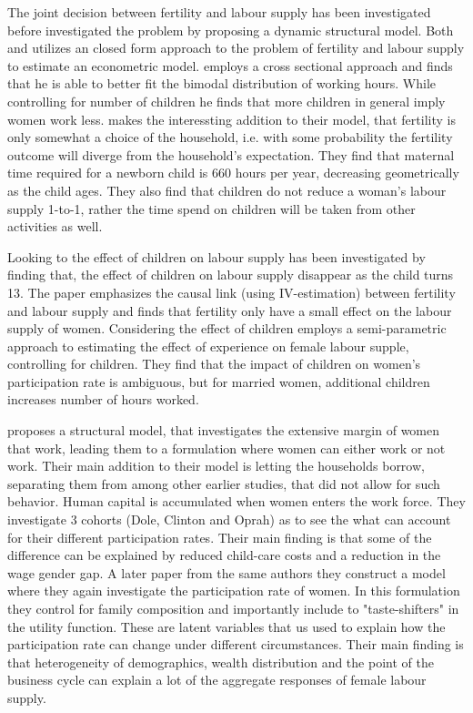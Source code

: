 The joint decision between fertility and labour supply has been investigated before \textcite{francesconi_joint_2002} investigated the problem by proposing a dynamic structural model. Both \textcite{moffitt_estimation_1984} and \textcite{hotz_empirical_1988} utilizes an closed form approach to the problem of fertility and labour supply to estimate an econometric model. \textcite{moffitt_estimation_1984} employs a cross sectional approach and finds that he is able to better fit the bimodal distribution of working hours. While controlling for number of children he finds that more children in general imply women work less. \textcite{hotz_empirical_1988} makes the interessting addition to their model, that fertility is only somewhat a choice of the household, i.e. with some probability the fertility outcome will diverge from the household's expectation. They find that maternal time required for a newborn child is 660 hours per year, decreasing geometrically as the child ages. They also find that children do not reduce a woman's labour supply 1-to-1, rather the time spend on children will be taken from other activities as well.

Looking to the effect of children on labour supply has been investigated by \textcite{angrist_children_1996} finding that, the effect of children on labour supply disappear as the child turns 13. The paper emphasizes the causal link (using IV-estimation) between fertility and labour supply and finds that fertility only have a small effect on the labour supply of women. Considering the effect of children  \textcite{altug_effect_1998} employs a semi-parametric approach to estimating the effect of experience on female labour supple, controlling for children. They find that the impact of children on women's participation rate is ambiguous, but for married women, additional children increases number of hours worked.

\textcite{attanasio_explaining_2008} proposes a structural model, that investigates the extensive margin of women that work, leading them to a formulation where women can either work or not work. Their main addition to their model is letting the households borrow, separating them from \textcite{francesconi_joint_2002} among other earlier studies, that did not allow for such behavior. Human capital is accumulated when women enters the work force. They investigate 3 cohorts (Dole, Clinton and Oprah) as to see the what can account for their different participation rates. Their main finding is that some of the difference can be explained by reduced child-care costs and a reduction in the wage gender gap. A later paper from the same authors \textcite{attanasio_aggregating_2018} they construct a model where they again investigate the participation rate of women. In this formulation they control for family composition and importantly include to "taste-shifters" in the utility function. These are latent variables that us used to explain how the participation rate can change under different circumstances. Their main finding is that heterogeneity of demographics, wealth distribution and the point of the business cycle can explain a lot of the aggregate responses of female labour supply.

